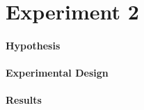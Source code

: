\documentclass[a4]{article}
\begin{document}

\section{Experiment 2}

\paragraph{Hypothesis} %


\paragraph{Experimental Design} 









\paragraph{Results} 
\end{document}
